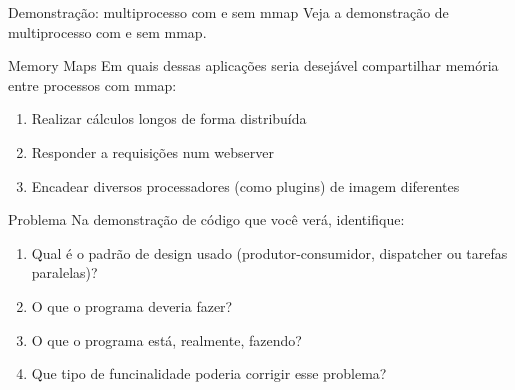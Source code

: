 \documentclass{beamer}
\begin{document}
\begin{frame}[fragile]{Demonstração: multiprocesso com e sem mmap}
  \centering
  \Large
  Veja a demonstração de multiprocesso com e sem mmap.
\end{frame}

\begin{frame}[fragile]{Memory Maps}
  \centering
  \Large
  Em quais dessas aplicações seria desejável compartilhar memória entre
  processos com mmap:
  \begin{enumerate}
    \item Realizar cálculos longos de forma distribuída
    \item Responder a requisições num webserver
    \item Encadear diversos processadores (como plugins) de imagem diferentes
  \end{enumerate}
\end{frame}

\begin{frame}[fragile]{Problema}
  \centering
  \large
  Na demonstração de código que você verá, identifique:
  \begin{enumerate}
  \item Qual é o padrão de design usado (produtor-consumidor, dispatcher ou
    tarefas paralelas)?
  \item O que o programa deveria fazer?
  \item O que o programa está, realmente, fazendo?
  \item Que tipo de funcinalidade poderia corrigir esse problema?
  \end{enumerate}
\end{frame}
\end{document}
